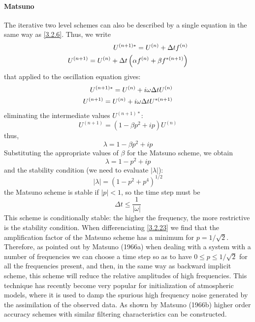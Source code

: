 \paragraph{Matsuno}
The iterative two level schemes can also be described by a single equation in the same way as \ref{3.2.6}. Thus, we write
\begin{align}\label{3.2.18}
    U^{(n+1)*}=U^{(n)}+\Delta tf^{(n)}\notag \\
    U^{(n+1)}=U^{(n)}+\Delta t\left(\alpha f^{(n)}+\beta f^{*(n+1)}\right)
\end{align}
that applied to the oscillation equation gives:
\begin{align}
    U^{(n+1)*}=U^{(n)}+i\omega\Delta tU^{(n)} \notag \\
    U^{(n+1)}=U^{(n)}+i\omega\Delta tU^{*(n+1)}
\end{align}
eliminating the intermediate values $U^{(n+1)*}$:
$$U^{(n+1)}=\left(1-\beta p^2+ip\right)U^{(n)}$$
thus, 
\begin{equation}\label{3.2.20}
    \lambda=1-\beta p^2+ip
\end{equation}
Substituting the appropriate values of $\beta$ for the Matsuno scheme, we obtain
\begin{equation}\label{3.2.21}
    \lambda=1-p^2+ip
\end{equation}
and the stability condition (we need to evaluate $|\lambda|$): 
\begin{equation}\label{3.2.23}
    |\lambda|=\left(1-p^2+p^4\right)^{1/2}
\end{equation}
the Matsuno scheme is stable if $|p|<1$, so the time step must be $$\Delta t\leq\frac{1}{|\omega|}$$
This scheme is conditionally stable: the higher the frequency, the more restrictive is the stability condition. When differenciating \ref{3.2.23} we find that the amplification factor of the Matsuno scheme has a minimum for $p=1/\sqrt{2}$. Therefore, as pointed out by Matsuno (1966a) when dealing with a system with a number of frequencies we can choose a time step so as to have $0\leq p\leq 1/\sqrt{2}$ for all the frequencies present, and then, in the same way as backward implicit scheme, this scheme will reduce the relative amplitudes of high frequencies. This technique has recently become very popular for initialization of atmospheric models, where it is used to damp the spurious high frequency noise generated by the assimilation of the observed data. As shown by Matsuno (1966b) higher order accuracy schemes with similar filtering characteristics can be constructed.

